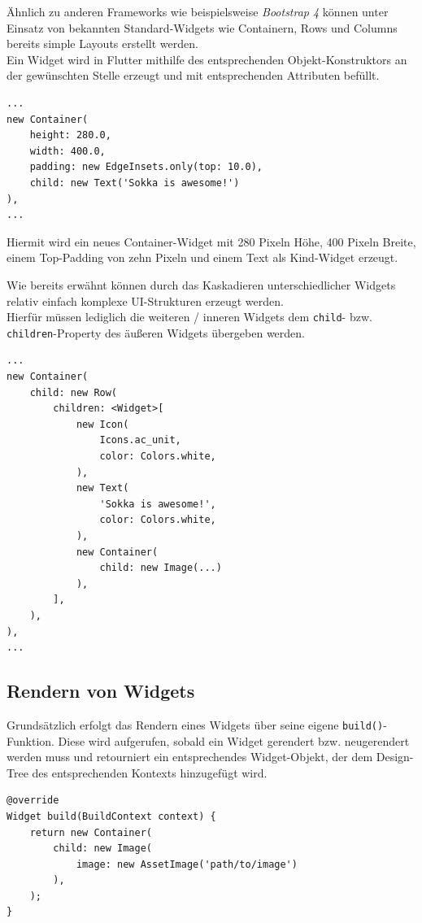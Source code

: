 Ähnlich zu anderen Frameworks wie beispielsweise \textit{Bootstrap 4}
können unter Einsatz von bekannten Standard-Widgets wie Containern, Rows und Columns
bereits simple Layouts erstellt werden.\\

Ein Widget wird in Flutter mithilfe des entsprechenden Objekt-Konstruktors
an der gewünschten Stelle erzeugt und mit entsprechenden Attributen befüllt.

\begin{lstlisting}
...
new Container(
    height: 280.0,
    width: 400.0,
    padding: new EdgeInsets.only(top: 10.0),
    child: new Text('Sokka is awesome!')
),
...
\end{lstlisting}

Hiermit wird ein neues Container-Widget mit 280 Pixeln Höhe,
400 Pixeln Breite, einem Top-Padding von zehn Pixeln und einem Text als
Kind-Widget erzeugt.

Wie bereits erwähnt können durch das Kaskadieren unterschiedlicher Widgets
relativ einfach komplexe UI-Strukturen erzeugt werden.\\
Hierfür müssen lediglich die weiteren / inneren Widgets dem 
\lstinline{child}- bzw. \lstinline{children}-Property des äußeren Widgets übergeben werden.
\pagebreak
\begin{lstlisting}
...
new Container(
    child: new Row(
        children: <Widget>[
            new Icon(
                Icons.ac_unit,
                color: Colors.white,
            ),
            new Text(
                'Sokka is awesome!',
                color: Colors.white,
            ),
            new Container(
                child: new Image(...)
            ),
        ],
    ),
),
...
\end{lstlisting}


\subsection{Rendern von Widgets}

Grundsätzlich erfolgt das Rendern eines Widgets über seine eigene \lstinline{build()}-Funktion. Diese wird aufgerufen,
sobald ein Widget gerendert bzw. neugerendert werden muss und retourniert ein entsprechendes Widget-Objekt,
der dem Design-Tree des entsprechenden Kontexts hinzugefügt wird.

\begin{lstlisting}
@override
Widget build(BuildContext context) {
    return new Container(
        child: new Image(
            image: new AssetImage('path/to/image')
        ),
    );
}
\end{lstlisting}

